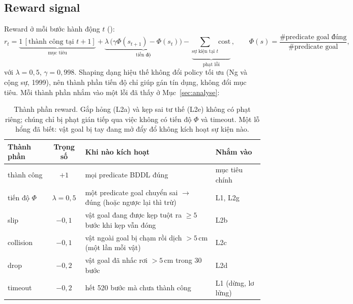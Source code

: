 \documentclass[10pt,a4paper]{article}
\newcommand{\code}[1]{\texttt{\detokenize{#1}}}
\begin{document}
\subsection{Reward signal}\label{sec:reward}
Reward ở mỗi bước hành động $t$ (\code{improve/src/reward_r2.py}):
\begin{equation}
r_t=\underbrace{1\,[\text{thành công tại }t{+}1]}_{\text{mục tiêu}}
+\underbrace{\lambda\,\big(\gamma\Phi(s_{t+1})-\Phi(s_t)\big)}_{\text{tiến độ}}
-\underbrace{\textstyle\sum_{\text{sự kiện tại }t}\text{cost}}_{\text{phạt lỗi}},\qquad
\Phi(s)=\frac{\#\text{predicate goal đúng}}{\#\text{predicate goal}},
\end{equation}
với $\lambda=0{,}5$, $\gamma=0{,}998$. Shaping dạng hiệu thế không đổi policy tối ưu (Ng và cộng sự, 1999), nên thành
phần tiến độ chỉ giúp gán tín dụng, không đổi mục tiêu. Mỗi thành phần nhắm vào một lỗi đã thấy ở Mục~\ref{sec:analyse}:

\begin{table}[H]
\centering\scriptsize
\begin{tabularx}{\linewidth}{@{}l c X l@{}}
\toprule
Thành phần & Trọng số & Khi nào kích hoạt & Nhắm vào \\
\midrule
thành công & $+1$ & mọi predicate BDDL đúng & mục tiêu chính \\
tiến độ $\Phi$ & $\lambda=0{,}5$ & một predicate goal chuyển sai $\to$ đúng (hoặc ngược lại thì trừ) & L1, L2g \\
slip & $-0{,}1$ & vật goal đang được kẹp tuột ra $\ge5$ bước khi kẹp vẫn đóng & L2b \\
collision & $-0{,}1$ & vật ngoài goal bị chạm rồi dịch $>5$\,cm (một lần mỗi vật) & L2c \\
drop & $-0{,}2$ & vật goal đã nhấc rơi $>5$\,cm trong 30 bước & L2d \\
timeout & $-0{,}2$ & hết 520 bước mà chưa thành công & L1 (dừng, lơ lửng) \\
\bottomrule
\end{tabularx}
\caption{Thành phần reward. Gắp hỏng (L2a) và kẹp sai tư thế (L2e) không có phạt riêng; chúng chỉ bị phạt gián tiếp qua
việc không có tiến độ $\Phi$ và timeout. Một lỗ hổng đã biết: vật goal bị tay đang mở đẩy đổ không kích hoạt sự kiện nào.}
\label{tab:reward}
\end{table}

\end{document}

